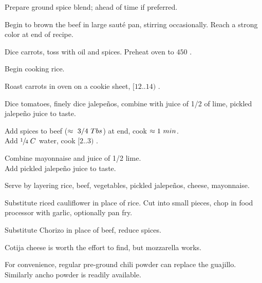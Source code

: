 
\begin{preparation}
\item Prepare ground spice blend; ahead of time if preferred.

\item Begin to brown the beef in large saut\'{e} pan, stirring occasionally. Reach a strong color at end of recipe.

\item Dice carrots, toss with oil and spices. Preheat oven to $450$ \Fahrenheit.

\item Begin cooking rice.

\item Roast carrots in oven on a cookie sheet, $[12..14)$ \minute.

\item Dice tomatoes, finely dice jalepe\~{n}os, combine with juice of 1/2 of lime, pickled jalepe\~{n}o juice to taste.

\item Add spices to beef ($\approx~3/4\ \Tablespoon$) at end, cook $\approx1~\minute$.\\
    Add $\onefourth\;C$ water, cook $[2..3)$ \minute.

\item Combine mayonnaise and juice of 1/2 lime.\\Add pickled jalepe\~{n}o juice to taste.

\item Serve by layering rice, beef, vegetables, pickled jalepe\~{n}os, cheese, mayonnaise.
\end{preparation}

\begin{variation}
\item Substitute riced cauliflower in place of rice. Cut into small pieces, chop in food processor with
    garlic, optionally pan fry.
\item Substitute Chorizo in place of beef, reduce spices.
\item Cotija cheese is worth the effort to find, but mozzarella works.
\item For convenience, regular pre-ground chili powder can replace the guajillo. Similarly ancho powder is
    readily available.
\end{variation}

\recipeend%
